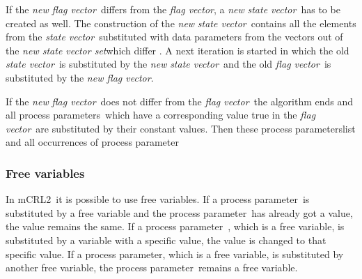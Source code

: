 \documentclass[a4paper,10pt]{article}
\newcommand{\mcrl}{mCRL2}
\newcommand{\pp}{process parameter}
\newcommand{\pps}{process parameters}
\newcommand{\ti}{\textit}
\newcommand{\sv}{\textit{state vector}}
\newcommand{\fv}{\textit{flag vector}}
\newcommand{\svs}{\textit{new state vector set}}
\newcommand{\nfv}{\textit{new flag vector}}
\begin{document}
 
If the \nfv\ differs from the \fv , a \ti{new} \sv\ has to be created as well. The construction of the \ti{new} \sv\ contains all the elements from the \sv\ substituted with data parameters from the vectors out of the \svs which differ . 
A next iteration is started in which the old \sv\ is substituted by the \ti{new} \sv\ and the old \fv\ is substituted by the \nfv .
  
If the \ti{new} \fv\ does not differ from the \fv\ the algorithm ends and all \pps\ which have a corresponding value true in the \fv\ are substituted by their constant values. Then these \pps list and all occurrences of \pp\ 

\subsubsection{Free variables}
In \mcrl\ it is possible to use free variables. %
If a \pp\ is substituted by a free variable and the \pp\ has already got a value, the value remains the same. If a \pp\ , which is a free variable, is substituted by a variable with a specific value, the value is changed to that specific value. If a \pp , which is a free variable, is substituted by another free variable, the \pp\ remains a free variable. 
\end{document}

